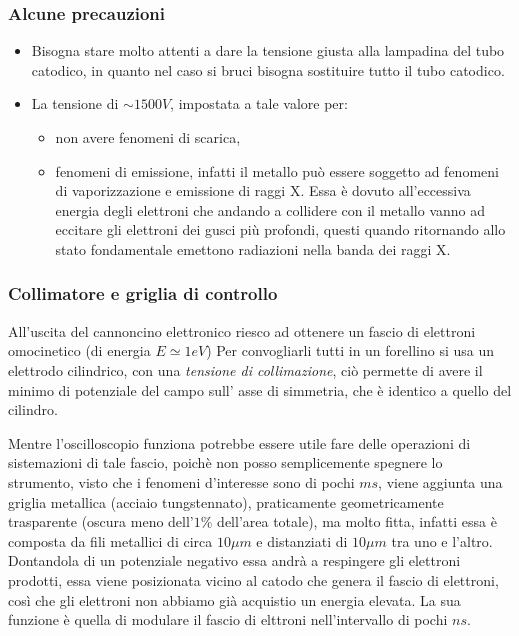 \documentclass{article}
\begin{document}
\subsubsection{Alcune precauzioni}
\begin{itemize}
    \item Bisogna stare molto attenti a dare la tensione giusta alla lampadina del tubo catodico, in quanto nel caso si bruci bisogna sostituire tutto il tubo catodico.
    \item La tensione di $\sim 1500 V$, impostata a tale valore per:
    \begin{itemize}
        \item non avere fenomeni di scarica,
        \item fenomeni di emissione, infatti il metallo può essere soggetto ad fenomeni di vaporizzazione e emissione di raggi X. Essa è dovuto all'eccessiva energia degli elettroni che andando
        a collidere con il metallo vanno ad eccitare gli elettroni dei gusci più profondi, 
        questi quando ritornando allo stato fondamentale emettono radiazioni nella banda dei raggi X.
    \end{itemize} 
\end{itemize}   

\subsubsection{Collimatore e griglia di controllo}
All'uscita del cannoncino elettronico riesco ad ottenere un fascio di elettroni omocinetico (di energia $E \simeq 1eV$)
Per convogliarli tutti in un forellino si usa un elettrodo cilindrico, con una \textit{tensione di collimazione}, 
ciò permette di avere il minimo di potenziale del campo sull' asse di simmetria, che è identico a quello del cilindro.

Mentre l'oscilloscopio funziona potrebbe essere utile fare delle operazioni di sistemazioni di tale fascio,
poichè non posso semplicemente spegnere lo strumento, visto che i fenomeni d'interesse sono di pochi $ms$, viene 
aggiunta una griglia metallica (acciaio tungstennato), praticamente geometricamente trasparente (oscura meno dell'$1\%$ dell'area totale), 
ma molto fitta, infatti essa è composta da  fili metallici di circa $10 \mu m$ e distanziati di $10 \mu m$ tra uno e l'altro. 
Dontandola di un potenziale negativo essa andrà a respingere gli elettroni prodotti,
essa viene posizionata vicino al catodo che genera il fascio di elettroni, così che gli elettroni non abbiamo già acquistio un energia elevata. 
La sua funzione è quella di modulare il fascio di elttroni nell'intervallo di pochi $ns$.\\
\end{document}
